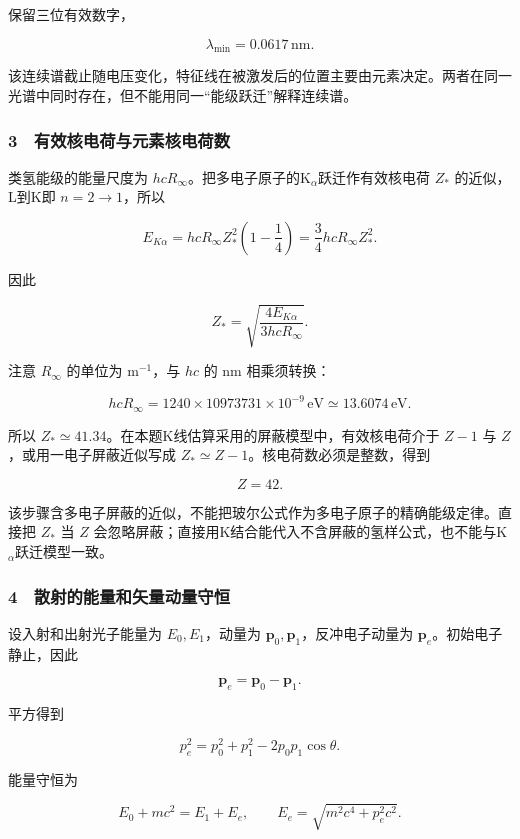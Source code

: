 \documentclass[12pt,a4paper,fontset=fandol]{ctexart}
\begin{document}
保留三位有效数字，

\[\boxed{\lambda_{\min}=0.0617\,\mathrm{nm}.}\]

该连续谱截止随电压变化，特征线在被激发后的位置主要由元素决定。两者在同一光谱中同时存在，但不能用同一``能级跃迁''解释连续谱。

\subsubsection{3　有效核电荷与元素核电荷数}\label{ux6709ux6548ux6838ux7535ux8377ux4e0eux5143ux7d20ux6838ux7535ux8377ux6570}

类氢能级的能量尺度为
\(hcR_\infty\)。把多电子原子的K\(_\alpha\)跃迁作有效核电荷 \(Z_*\)
的近似，L到K即 \(n=2\to1\)，所以

\[E_{K\alpha}=hcR_\infty Z_*^2
\left(1-\frac14\right)=\frac34hcR_\infty Z_*^2.\]

因此

\[\boxed{Z_*=
\sqrt{\frac{4E_{K\alpha}}{3hcR_\infty}}.}\]

注意 \(R_\infty\) 的单位为 \(\mathrm{m^{-1}}\)，与 \(hc\) 的 nm
相乘须转换：

\[hcR_\infty=1240\times10973731\times10^{-9}\,\mathrm{eV}
\simeq13.6074\,\mathrm{eV}.\]

所以 \(Z_*\simeq41.34\)。在本题K线估算采用的屏蔽模型中，有效核电荷介于
\(Z-1\) 与 \(Z\)，或用一电子屏蔽近似写成
\(Z_*\simeq Z-1\)。核电荷数必须是整数，得到

\[\boxed{Z=42.}\]

该步骤含多电子屏蔽的近似，不能把玻尔公式作为多电子原子的精确能级定律。直接把
\(Z_*\) 当 \(Z\)
会忽略屏蔽；直接用K结合能代入不含屏蔽的氢样公式，也不能与K\(_\alpha\)跃迁模型一致。

\subsubsection{4　散射的能量和矢量动量守恒}\label{ux6563ux5c04ux7684ux80fdux91cfux548cux77e2ux91cfux52a8ux91cfux5b88ux6052}

设入射和出射光子能量为 \(E_0,E_1\)，动量为
\(\boldsymbol p_0,\boldsymbol p_1\)，反冲电子动量为
\(\boldsymbol p_e\)。初始电子静止，因此

\[\boldsymbol p_e=\boldsymbol p_0-\boldsymbol p_1.\]

平方得到

\[p_e^2=p_0^2+p_1^2-2p_0p_1\cos\theta.\]

能量守恒为

\[\boxed{E_0+mc^2=E_1+E_e,\qquad
E_e=\sqrt{m^2c^4+p_e^2c^2}.}\]
\end{document}

